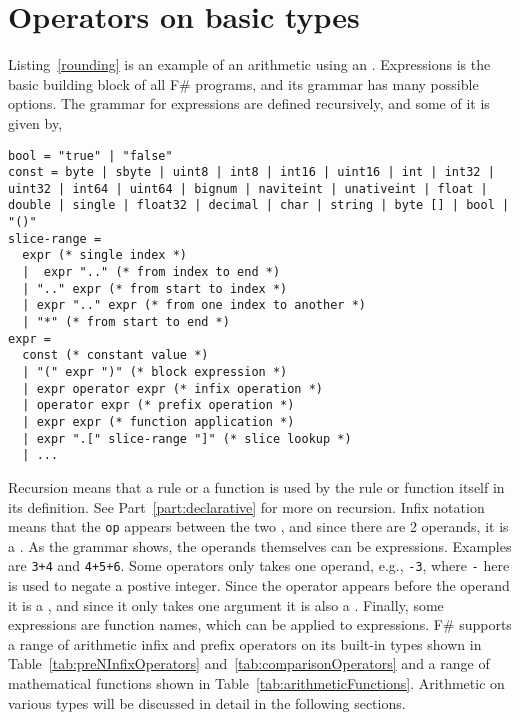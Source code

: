 \section{Operators on basic types}
Listing~\ref{rounding} is an example of an arithmetic  using an . Expressions is the basic building block of all F\# programs, and its grammar has many possible options. The grammar for expressions are defined recursively, and some of it is given by, 
%
\begin{lstlisting}[language=EBNF,caption=expressionArithmetic]
bool = "true" | "false"
const = byte | sbyte | uint8 | int8 | int16 | uint16 | int | int32 | uint32 | int64 | uint64 | bignum | naviteint | unativeint | float | double | single | float32 | decimal | char | string | byte [] | bool | "()"
slice-range = 
  expr (* single index *)
  |  expr ".." (* from index to end *)
  | ".." expr (* from start to index *)
  | expr ".." expr (* from one index to another *)
  | "*" (* from start to end *)
expr = 
  const (* constant value *)
  | "(" expr ")" (* block expression *)
  | expr operator expr (* infix operation *)
  | operator expr (* prefix operation *)
  | expr expr (* function application *)
  | expr ".[" slice-range "]" (* slice lookup *)
  | ...
\end{lstlisting}
%
Recursion means that a rule or a function is used by the rule or function itself in its definition. See Part~\ref{part:declarative} for more on recursion. Infix notation means that the  \lstinline[language=ebnf]!op! appears between the two , and since there are 2 operands, it is a . As the grammar shows, the operands themselves can be expressions. Examples are \lstinline!3+4! and \lstinline!4+5+6!. Some operators only takes one operand, e.g., \lstinline!-3!, where \lstinline!-! here is used to negate a postive integer. Since the operator appears before the operand it is a , and since it only takes one argument it is also a . Finally, some expressions are function names, which can be applied to expressions. F\# supports a range of arithmetic infix and prefix operators on its built-in types shown in Table~\ref{tab:preNInfixOperators} and~\ref{tab:comparisonOperators} and a range of mathematical functions shown in Table~\ref{tab:arithmeticFunctions}. Arithmetic on various types will be discussed in detail in the following sections. 
